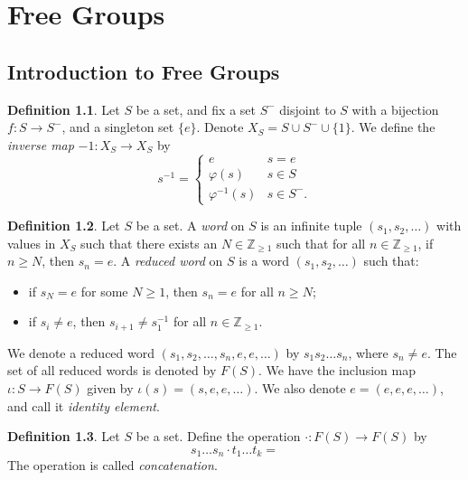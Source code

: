 \documentclass[a4paper, openany]{memoir}
\theoremstyle{definition}
\newtheorem{definition}{Definition}[section]
\theoremstyle{plain}
\begin{document}
    \chapter{Free Groups}
    \section{Introduction to Free Groups}
    \begin{definition}
        Let $S$ be a set, and fix a set $S^-$ disjoint to $S$ with a bijection $f\colon S \to S^-$, and a singleton set $\{e\}$. Denote $X_S = S \cup S^- \cup \{1\}$. We define the \emph{inverse map} $-1\colon X_S \to X_S$ by
        \[s^{-1} = \begin{cases}
            e & s = e \\
            \varphi(s) & s \in S \\
            \varphi^{-1}(s) & s \in S^-.
        \end{cases}\]
    \end{definition}

    \begin{definition}
        Let $S$ be a set. A \emph{word} on $S$ is an infinite tuple $(s_1, s_2, \dots)$ with values in $X_S$ such that there exists an $N \in \mathbb{Z}_{\geq 1}$ such that for all $n \in \mathbb{Z}_{\geq 1}$, if $n \geq N$, then $s_n = e$. A \emph{reduced word} on $S$ is a word $(s_1, s_2, \dots)$ such that:
        \begin{itemize}
            \item if $s_N = e$ for some $N \geq 1$, then $s_n = e$ for all $n \geq N$;
            \item if $s_i \neq e$, then $s_{i+1} \neq s_1^{-1}$ for all $n \in \mathbb{Z}_{\geq 1}$.
        \end{itemize}
        We denote a reduced word $(s_1, s_2, \dots, s_n, e, e, \dots)$ by $s_1s_2 \dots s_n$, where $s_n \neq e$. The set of all reduced words is denoted by $F(S)$. We have the inclusion map $\iota \colon S \to F(S)$ given by $\iota(s) = (s, e, e, \dots)$. We also denote $e = (e, e, e, \dots)$, and call it \emph{identity element}.
    \end{definition}

    \begin{definition}
        Let $S$ be a set. Define the operation $\cdot \colon F(S) \to F(S)$ by 
        \[s_1 \dots s_n \cdot t_1 \dots t_k = \]
        The operation is called \emph{concatenation}.
    \end{definition}
\end{document}
